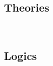 {\subsection*{Theories}
\ 

\theories
\medskip

\subsection*{Logics}
\ 

\logics
\medskip

%
%
%
%
%

}

